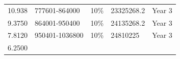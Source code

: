 \documentclass[11pt,a4paperpaper,]{report}
\begin{document}
\begin{longtable}[]{@{}llllc@{}}
\begin{minipage}[t]{0.12\columnwidth}
10.938\strut
\end{minipage} & \begin{minipage}[t]{0.23\columnwidth}\raggedright\strut
777601-864000\strut
\end{minipage} & \begin{minipage}[t]{0.14\columnwidth}\raggedright\strut
10\%\strut
\end{minipage} & \begin{minipage}[t]{0.19\columnwidth}\raggedright\strut
23325268.2\strut
\end{minipage} & \begin{minipage}[t]{0.16\columnwidth}\centering\strut
Year 3\strut
\end{minipage}\tabularnewline
\begin{minipage}[t]{0.12\columnwidth}\raggedright\strut
9.3750\strut
\end{minipage} & \begin{minipage}[t]{0.23\columnwidth}\raggedright\strut
864001-950400\strut
\end{minipage} & \begin{minipage}[t]{0.14\columnwidth}\raggedright\strut
10\%\strut
\end{minipage} & \begin{minipage}[t]{0.19\columnwidth}\raggedright\strut
24135268.2\strut
\end{minipage} & \begin{minipage}[t]{0.16\columnwidth}\centering\strut
Year 3\strut
\end{minipage}\tabularnewline
\begin{minipage}[t]{0.12\columnwidth}\raggedright\strut
7.8120\strut
\end{minipage} & \begin{minipage}[t]{0.23\columnwidth}\raggedright\strut
950401-1036800\strut
\end{minipage} & \begin{minipage}[t]{0.14\columnwidth}\raggedright\strut
10\%\strut
\end{minipage} & \begin{minipage}[t]{0.19\columnwidth}\raggedright\strut
24810225\strut
\end{minipage} & \begin{minipage}[t]{0.16\columnwidth}\centering\strut
Year 3\strut
\end{minipage}\tabularnewline
\begin{minipage}[t]{0.12\columnwidth}\raggedright\strut
6.2500\strut
\end{minipage} & \begin{minipage}[t]{0.23\columnwidth}\raggedright\strut

\end{minipage}
\end{longtable}
\end{document}
